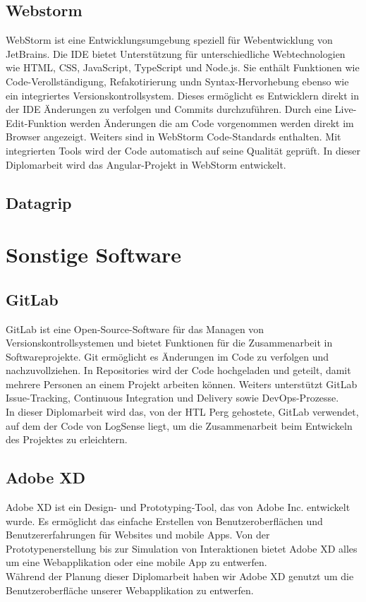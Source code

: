 \documentclass{report}
\begin{document}
\subsection{Webstorm}
WebStorm ist eine Entwicklungsumgebung speziell für Webentwicklung von JetBrains. Die IDE bietet Unterstützung für unterschiedliche Webtechnologien wie HTML, CSS, JavaScript, TypeScript und Node.js. Sie enthält Funktionen wie Code-Verollständigung, Refakotirierung undn Syntax-Hervorhebung ebenso wie ein integriertes Versionskontrollsystem. Dieses ermöglicht es Entwicklern direkt in der IDE Änderungen zu verfolgen und Commits durchzuführen. Durch eine Live-Edit-Funktion werden Änderungen die am Code vorgenommen werden direkt im Browser angezeigt. Weiters sind in WebStorm Code-Standards enthalten. Mit integrierten Tools wird der Code automatisch auf seine Qualität geprüft.
In dieser Diplomarbeit wird das Angular-Projekt in WebStorm entwickelt.

\subsection{Datagrip}
\section{Sonstige Software}
\subsection{GitLab}
GitLab ist eine Open-Source-Software für das Managen von Versionskontrollsystemen und bietet Funktionen für die Zusammenarbeit in Softwareprojekte. Git ermöglicht es Änderungen im Code zu verfolgen und nachzuvollziehen. In Repositories wird der Code hochgeladen und geteilt, damit mehrere Personen an einem Projekt arbeiten können. Weiters unterstützt GitLab Issue-Tracking, Continuous Integration und Delivery sowie DevOps-Prozesse.
\\
In dieser Diplomarbeit wird das, von der HTL Perg gehostete, GitLab verwendet, auf dem der Code von LogSense liegt, um die Zusammenarbeit beim Entwickeln des Projektes zu erleichtern.
\subsection{Adobe XD}
Adobe XD ist ein Design- und Prototyping-Tool, das von Adobe Inc. entwickelt wurde. Es ermöglicht das einfache Erstellen von Benutzeroberflächen und Benutzererfahrungen für Websites und mobile Apps. Von der Prototypenerstellung bis zur Simulation von Interaktionen bietet Adobe XD alles um eine Webapplikation oder eine mobile App zu entwerfen. 
\\Während der Planung dieser Diplomarbeit haben wir Adobe XD genutzt um die Benutzeroberfläche unserer Webapplikation zu entwerfen.
\end{document}
